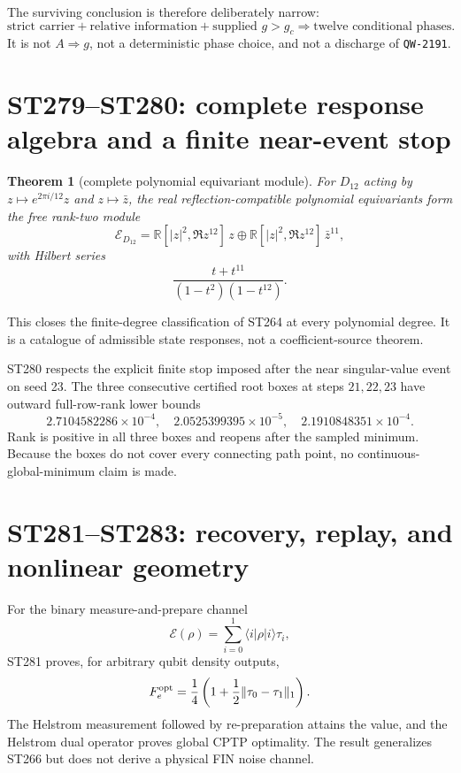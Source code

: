 \documentclass[11pt,a4paper]{article}
\newtheorem{theorem}{Theorem}[section]
\begin{document}
The surviving conclusion is therefore deliberately narrow:
\[
\boxed{\text{strict carrier}+\text{relative information}+\text{supplied }g>g_c
\Rightarrow\text{twelve conditional phases}.}
\]
It is not
$A\Rightarrow g$, not a deterministic phase choice, and not a discharge of
\texttt{QW-2191}.

\section{ST279--ST280: complete response algebra and a finite near-event stop}

\begin{theorem}[complete polynomial equivariant module]
For $D_{12}$ acting by $z\mapsto e^{2\pi i/12}z$ and $z\mapsto\bar z$, the real
reflection-compatible polynomial equivariants form the free rank-two module
\[
\mathcal E_{D_{12}}=
\mathbb R[|z|^2,\Re z^{12}]\,z
\oplus
\mathbb R[|z|^2,\Re z^{12}]\,\bar z^{11},
\]
with Hilbert series
\[
\frac{t+t^{11}}{(1-t^2)(1-t^{12})}.
\]
\end{theorem}

This closes the finite-degree classification of ST264 at every polynomial degree. It is a
catalogue of admissible state responses, not a coefficient-source theorem.

ST280 respects the explicit finite stop imposed after the near singular-value event on seed
23. The three consecutive certified root boxes at steps $21,22,23$ have outward full-row-rank
lower bounds
\[
2.7104582286\times10^{-4},\quad
2.0525399395\times10^{-5},\quad
2.1910848351\times10^{-4}.
\]
Rank is positive in all three boxes and reopens after the sampled minimum. Because the boxes
do not cover every connecting path point, no continuous-global-minimum claim is made.

\section{ST281--ST283: recovery, replay, and nonlinear geometry}

For the binary measure-and-prepare channel
\[
\mathcal E(\rho)=\sum_{i=0}^1\langle i|\rho|i\rangle\tau_i,
\]
ST281 proves, for arbitrary qubit density outputs,
\[
F_e^{\rm opt}=\frac14\left(1+\frac12\|\tau_0-\tau_1\|_1\right).
\]
The Helstrom measurement followed by re-preparation attains the value, and the Helstrom dual
operator proves global CPTP optimality. The result generalizes ST266 but does not derive a
physical FIN noise channel.
\end{document}
